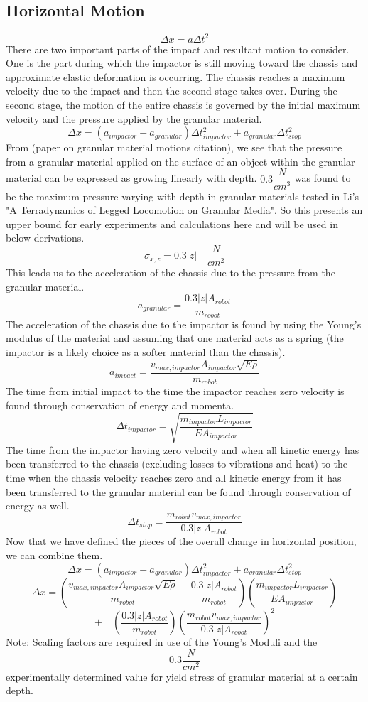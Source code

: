 \documentclass{article}
\begin{document}
\subsection{Horizontal Motion}
$$\Delta x = a \Delta t^2$$
There are two important parts of the impact and resultant motion to consider. One is the part during which the impactor is still moving toward the chassis and approximate elastic deformation is occurring. The chassis reaches a maximum velocity due to the impact and then the second stage takes over. During the second stage, the motion of the entire chassis is governed by the initial maximum velocity and the pressure applied by the granular material.
$$\Delta x = (a_{impactor} - a_{granular}) \Delta t^2_{impactor} + a_{granular} \Delta t_{stop}^2$$
From (paper on granular material motions citation), we see that the pressure from a granular material applied on the surface of an object within the granular material can be expressed as growing linearly with depth. $0.3 \dfrac{N}{cm^3}$ was found to be the maximum pressure varying with depth in granular materials tested in Li's "A Terradynamics of Legged Locomotion on Granular Media". So this presents an upper bound for early experiments and calculations here and will be used in below derivations.
$$\sigma_{x,z} = 0.3 |z| \quad \dfrac{N}{cm^2}$$
This leads us to the acceleration of the chassis due to the pressure from the granular material.
$$a_{granular} = \dfrac{0.3 |z| A_{robot}}{m_{robot}}$$
The acceleration of the chassis due to the impactor is found by using the Young's modulus of the material and assuming that one material acts as a spring (the impactor is a likely choice as a softer material than the chassis).
$$a_{impact} = \dfrac{v_{max, impactor} A_{impactor} \sqrt{E \rho}}{m_{robot}}$$
The time from initial impact to the time the impactor reaches zero velocity is found through conservation of energy and momenta.
$$\Delta t_{impactor} = \sqrt{\dfrac{m_{impactor} L_{impactor}}{E A_{impactor}}}$$
The time from the impactor having zero velocity and when all kinetic energy has been transferred to the chassis (excluding losses to vibrations and heat) to the time when the chassis velocity reaches zero and all kinetic energy from it has been transferred to the granular material can be found through conservation of energy as well.
$$\Delta t_{stop} = \dfrac{m_{robot} v_{max, impactor}}{0.3 |z| A_{robot}}$$
Now that we have defined the pieces of the overall change in horizontal position, we can combine them.
$$\Delta x = (a_{impactor} - a_{granular}) \Delta t^2_{impactor} + a_{granular} \Delta t_{stop}^2$$
$$\Delta x = (\dfrac{v_{max, impactor} A_{impactor} \sqrt{E \rho}}{m_{robot}} - \dfrac{0.3 |z| A_{robot}}{m_{robot}}) (\dfrac{m_{impactor} L_{impactor}}{E A_{impactor}})$$
\newline
$$+ \quad (\dfrac{0.3 |z| A_{robot}}{m_{robot}}) (\dfrac{m_{robot} v_{max, impactor}}{0.3 |z| A_{robot}})^2$$
\newline
Note: Scaling factors are required in use of the Young's Moduli and the $$0.3\dfrac{N}{cm^2}$$ experimentally determined value for yield stress of granular material at a certain depth.
\end{document}
